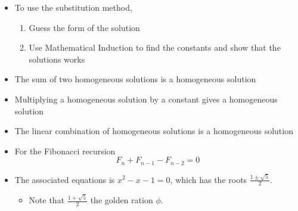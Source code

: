 \documentclass[12pt]{scrartcl}
\begin{document}
\begin{itemize}
    \item To use the substitution method,
        \begin{enumerate}
            \item Guess the form of the solution
            \item Use Mathematical Induction to find the constants and show that the solutions works
        \end{enumerate}
    \item The sum of two homogeneous solutions is a homogeneous solution
    \item Multiplying a homogeneous solution by a constant gives a homogeneous solution
    \item The linear combination of homogeneous solutions is a homogeneous solution
    \item For the Fibonacci recursion
        \begin{equation*}
            F_n + F_{n - 1} - F_{n - 2} = 0
        \end{equation*}

    \item The associated equations is $x^2 - x - 1 = 0$, which has the roots $\frac{1 \pm \sqrt{5}}{2}$.
        \begin{itemize}
            \item Note that $\frac{1 + \sqrt{5}}{2}$ the golden ration $\phi$.
        \end{itemize}
\end{itemize}
\end{document}
